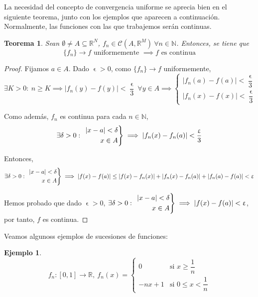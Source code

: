 \documentclass[11pt, a4paper]{article}
\let\epsilon\upvarepsilon
\providecommand{\abs}[1]{\lvert#1\rvert}
\newcommand{\R}{\mathbb{R}}
\newcommand{\N}{\mathbb{N}}
\newcommand{\fn}{\{f_n\}}
\theoremstyle{theorem-style}
\newtheorem{nth}{Teorema}[section]
\theoremstyle{definition-style}
\theoremstyle{remark-style}
\theoremstyle{example-style}
\newtheorem{ejemplo}{Ejemplo}[section]
\newenvironment{rcases}
  {\left.\begin{aligned}}
  {\end{aligned}\right\rbrace}
\begin{document}
La necesidad del concepto de convergencia uniforme se aprecia bien en el siguiente teorema, junto con los ejemplos que aparecen a continuación. Normalmente, las funciones con las que trabajemos serán continuas.

\begin{nth}
\label{2}
	Sean $\emptyset \ne A \subseteq \R^N$, $f_n \in \mathcal{C}(A,\R^M)\ \forall n\in \N$. Entonces, se tiene que
	\[
	\fn \to f \text{ uniformemente } \implies f \text{ es continua}
	\]
\end{nth}

\begin{proof}
	Fijamos $a\in A$. Dado $\epsilon>0$, como $\fn\to f$ uniformemente,
	\[
	\exists K>0:\ n\ge K \implies \abs{f_n(y)-f(y)}<\dfrac{\epsilon}{3}\ \forall y\in A \implies \begin{cases}
	\abs{f_n(a)-f(a)}<\dfrac{\epsilon}{3}\\
	\abs{f_n(x)-f(x)}<\dfrac{\epsilon}{3}
\end{cases}
	\]
	
	Como además, $f_n$ es continua para cada $n\in \N$,
	\[
	\exists \delta>0:\ \begin{rcases}
	\abs{x-a}<\delta\\
	x\in A
\end{rcases} \implies \abs{f_n(x)-f_n(a)} < \dfrac{\epsilon}{3}
	\] 
	
	Entonces,
	\[
	\exists \delta>0:\ \begin{rcases}
	\abs{x-a}<\delta\\
	x\in A
\end{rcases} \implies \abs{f(x)-f(a)} \le \abs{f(x)-f_n(x)} + \abs{f_n(x)-f_n(a)}+\abs{f_n(a)-f(a)} < \epsilon
	\]
	
	Hemos probado que dado $\epsilon > 0$, $\exists \delta>0:\ \begin{rcases}
	\abs{x-a}<\delta\\
	x\in A
	\end{rcases} \implies \abs{f(x)-f(a)}<\epsilon$, por tanto, $f$ es continua. 
\end{proof}

Veamos algunoss ejemplos de sucesiones de funciones:

\begin{ejemplo}
	\[
		f_n : [0,1] \to \R,\ f_n(x) = \begin{cases}
	         0 & \text{si } x\ge \dfrac{1}{n}\\
	         -nx+1 & \text{si } 0\le x < \dfrac{1}{n}
\end{cases}
	\]
\end{ejemplo}
\end{document}
